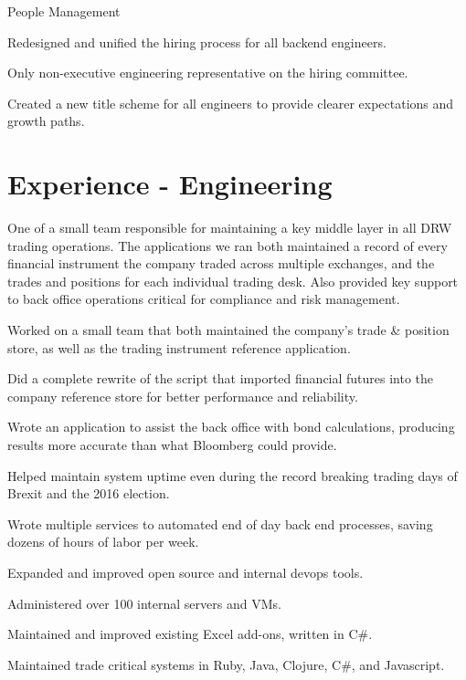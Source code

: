 \documentclass[]{deedy-resume-openfont}
\begin{document}
\sectionsep
People Management
\begin{tightemize}
  \item Redesigned and unified the hiring process for all backend engineers.
  \item Only non-executive engineering representative on the hiring committee.
  \item Created a new title scheme for all engineers to provide clearer expectations and growth paths.
\end{tightemize}

\pagebreak

\section{Experience - Engineering}

\vspace{\topsep}
One of a small team responsible for maintaining a key middle layer in all DRW trading operations. The applications we ran both maintained a record of every financial instrument the company traded across multiple exchanges, and the trades and positions for each individual trading desk. Also provided key support to back office operations critical for compliance and risk management.
\vspace{\topsep}
\begin{tightemize}
\item Worked on a small team that both maintained the company's trade \& position store, as well as the trading instrument reference application.
\item Did a complete rewrite of the script that imported financial futures into the company reference store for better performance and reliability.
\item Wrote an application to assist the back office with bond calculations, producing results more accurate than what Bloomberg could provide.
\item Helped maintain system uptime even during the record breaking trading days of Brexit and the 2016 election.
\item Wrote multiple services to automated end of day back end processes, saving dozens of hours of labor per week.
\item Expanded and improved open source and internal devops tools.
\item Administered over 100 internal servers and VMs.
\item Maintained and improved existing Excel add-ons, written in C\#.
\item Maintained trade critical systems in Ruby, Java, Clojure, C\#, and Javascript.
\end{tightemize}
\sectionsep
\end{document}
